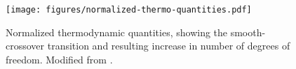 \begin{figure}[ht]
  \centering
  \texttt{[image: figures/normalized-thermo-quantities.pdf]}
  \caption{Normalized thermodynamic quantities, showing the smooth-crossover transition and resulting increase in number of degrees of freedom.  Modified from \protect\cite{PhysRevD.90.094503}.}
  \label{fig:normalized-thermo-quantities}
\end{figure}
